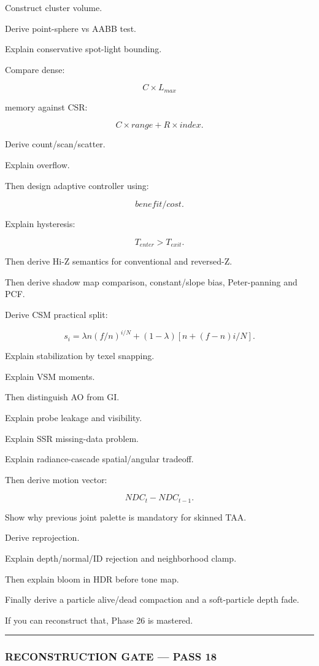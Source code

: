 Construct cluster volume.

Derive point-sphere vs AABB test.

Explain conservative spot-light bounding.

Compare dense:

\[
C\times L_{max}
\]

memory against CSR:

\[
C\times range+
R\times index.
\]

Derive count/scan/scatter.

Explain overflow.

Then design adaptive controller using:

\[
benefit/cost.
\]

Explain hysteresis:

\[
T_{enter}>T_{exit}.
\]

Then derive Hi-Z semantics for conventional and reversed-Z.

Then derive shadow map comparison, constant/slope bias, Peter-panning and PCF.

Derive CSM practical split:

\[
s_i=
\lambda
n(f/n)^{i/N}
+
(1-\lambda)
[n+(f-n)i/N].
\]

Explain stabilization by texel snapping.

Explain VSM moments.

Then distinguish AO from GI.

Explain probe leakage and visibility.

Explain SSR missing-data problem.

Explain radiance-cascade spatial/angular tradeoff.

Then derive motion vector:

\[
NDC_t-NDC_{t-1}.
\]

Show why previous joint palette is mandatory for skinned TAA.

Derive reprojection.

Explain depth/normal/ID rejection and neighborhood clamp.

Then explain bloom in HDR before tone map.

Finally derive a particle alive/dead compaction and a soft-particle depth fade.

If you can reconstruct that, Phase 26 is mastered.

\begin{center}\rule{0.5\linewidth}{0.5pt}\end{center}

\subsubsection{RECONSTRUCTION GATE --- PASS 18}\label{reconstruction-gate-pass-18}

